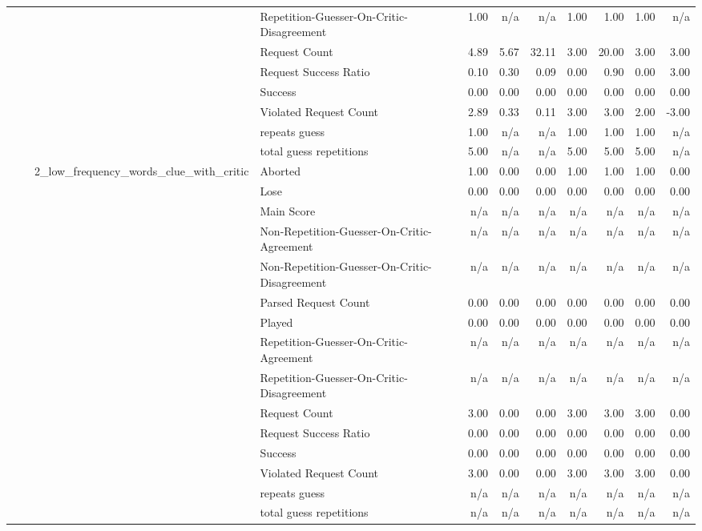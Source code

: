 \begin{tabular}{llllrrrrrrr}
 &  &  & Repetition-Guesser-On-Critic-Disagreement & 1.00 & n/a & n/a & 1.00 & 1.00 & 1.00 & n/a \\
 &  &  & Request Count & 4.89 & 5.67 & 32.11 & 3.00 & 20.00 & 3.00 & 3.00 \\
 &  &  & Request Success Ratio & 0.10 & 0.30 & 0.09 & 0.00 & 0.90 & 0.00 & 3.00 \\
 &  &  & Success & 0.00 & 0.00 & 0.00 & 0.00 & 0.00 & 0.00 & 0.00 \\
 &  &  & Violated Request Count & 2.89 & 0.33 & 0.11 & 3.00 & 3.00 & 2.00 & -3.00 \\
 &  &  & repeats guess & 1.00 & n/a & n/a & 1.00 & 1.00 & 1.00 & n/a \\
 &  &  & total guess repetitions & 5.00 & n/a & n/a & 5.00 & 5.00 & 5.00 & n/a \\
\cline{3-11}
 &  & \multirow[t]{15}{*}{2_low_frequency_words_clue_with_critic} & Aborted & 1.00 & 0.00 & 0.00 & 1.00 & 1.00 & 1.00 & 0.00 \\
 &  &  & Lose & 0.00 & 0.00 & 0.00 & 0.00 & 0.00 & 0.00 & 0.00 \\
 &  &  & Main Score & n/a & n/a & n/a & n/a & n/a & n/a & n/a \\
 &  &  & Non-Repetition-Guesser-On-Critic-Agreement & n/a & n/a & n/a & n/a & n/a & n/a & n/a \\
 &  &  & Non-Repetition-Guesser-On-Critic-Disagreement & n/a & n/a & n/a & n/a & n/a & n/a & n/a \\
 &  &  & Parsed Request Count & 0.00 & 0.00 & 0.00 & 0.00 & 0.00 & 0.00 & 0.00 \\
 &  &  & Played & 0.00 & 0.00 & 0.00 & 0.00 & 0.00 & 0.00 & 0.00 \\
 &  &  & Repetition-Guesser-On-Critic-Agreement & n/a & n/a & n/a & n/a & n/a & n/a & n/a \\
 &  &  & Repetition-Guesser-On-Critic-Disagreement & n/a & n/a & n/a & n/a & n/a & n/a & n/a \\
 &  &  & Request Count & 3.00 & 0.00 & 0.00 & 3.00 & 3.00 & 3.00 & 0.00 \\
 &  &  & Request Success Ratio & 0.00 & 0.00 & 0.00 & 0.00 & 0.00 & 0.00 & 0.00 \\
 &  &  & Success & 0.00 & 0.00 & 0.00 & 0.00 & 0.00 & 0.00 & 0.00 \\
 &  &  & Violated Request Count & 3.00 & 0.00 & 0.00 & 3.00 & 3.00 & 3.00 & 0.00 \\
 &  &  & repeats guess & n/a & n/a & n/a & n/a & n/a & n/a & n/a \\
 &  &  & total guess repetitions & n/a & n/a & n/a & n/a & n/a & n/a & n/a \\

\end{tabular}
